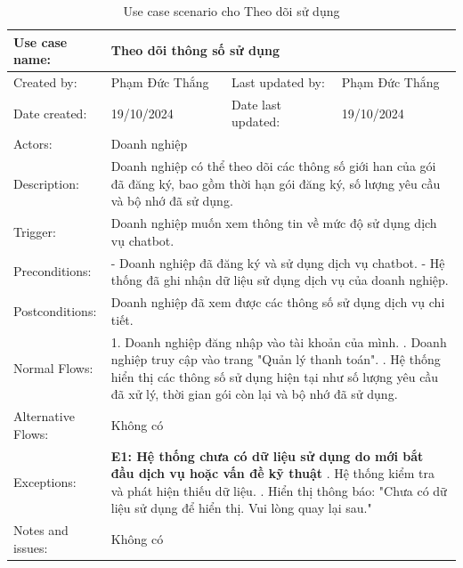 \begin{table}[H]
\centering
\begin{tabular}{|l|l|l|l|}
\hline
Use case name: & \multicolumn{3}{|l|}{Theo dõi thông số sử dụng} \\
\hline
Created by: & Phạm Đức Thắng & Last updated by: & Phạm Đức Thắng \\
\hline
Date created: & 19/10/2024 & Date last updated: & 19/10/2024 \\
\hline
Actors: & \multicolumn{3}{|l|}{Doanh nghiệp} \\
\hline
Description: & \multicolumn{3}{|p{12cm}|}{Doanh nghiệp có thể theo dõi các thông số giới han của gói đã đăng ký, bao gồm thời hạn gói đăng ký, số lượng yêu cầu và bộ nhớ đã sử dụng.} \\
\hline
Trigger: & \multicolumn{3}{|p{12cm}|}{Doanh nghiệp muốn xem thông tin về mức độ sử dụng dịch vụ chatbot.} \\
\hline
Preconditions: & \multicolumn{3}{|p{12cm}|}{
- Doanh nghiệp đã đăng ký và sử dụng dịch vụ chatbot. \newline
- Hệ thống đã ghi nhận dữ liệu sử dụng dịch vụ của doanh nghiệp.
} \\
\hline
Postconditions: & \multicolumn{3}{|p{12cm}|}{Doanh nghiệp đã xem được các thông số sử dụng dịch vụ chi tiết.} \\
\hline
Normal Flows: & \multicolumn{3}{|p{12cm}|}{
1. Doanh nghiệp đăng nhập vào tài khoản của mình. \newline
2. Doanh nghiệp truy cập vào trang "Quản lý thanh toán". \newline
3. Hệ thống hiển thị các thông số sử dụng hiện tại như số lượng yêu cầu đã xử lý, thời gian gói còn lại và bộ nhớ đã sử dụng.
}\\
\hline
Alternative Flows: & \multicolumn{3}{|p{12cm}|}{Không có} \\
\hline
Exceptions: & \multicolumn{3}{|p{12cm}|}{
\textbf{E1: Hệ thống chưa có dữ liệu sử dụng do mới bắt đầu dịch vụ hoặc vấn đề kỹ thuật} \newline
5.1. Hệ thống kiểm tra và phát hiện thiếu dữ liệu. \newline
5.2. Hiển thị thông báo: "Chưa có dữ liệu sử dụng để hiển thị. Vui lòng quay lại sau."
} \\
\hline
Notes and issues: & \multicolumn{3}{|p{12cm}|}{Không có} \\
\hline
\end{tabular}
\caption{Use case scenario cho Theo dõi sử dụng}
\end{table}

